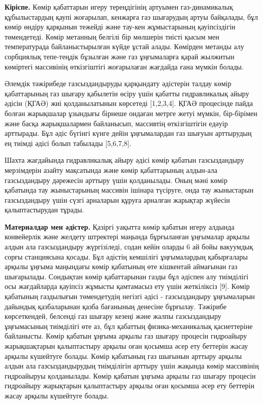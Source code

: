\begin{multicols}{2}
{\bfseries Кіріспе.} Көмір қабаттарын игеру тереңдігінің артуымен
газ-динамикалық құбылыстардың қаупі жоғарылап, кенжарға газ шығарудың
артуы байқалады, бұл көмір өндіру қарқынын тежейді және тау-кен
жұмыстарының қауіпсіздігін төмендетеді. Көмір метанның белгілі бір
мөлшерін тиісті қысым мен температурада байланыстырылған күйде ұстай
алады. Көмірден метанды алу сорбциялық тепе-теңдік бұзылған және газ
ұңғымаларға қарай жылжитын көміртегі массивінің өткізгіштігі жоғарылаған
жағдайда ғана мүмкін болады.

Әлемдік тәжірибеде газсыздандыруды қарқындату әдістерін талдау көмір
қабаттарының газ шығару қабылетін өсіру үшін қабатты гидравликалық айыру
әдісін (ҚГАӘ) жиі қолданылатынын көрсетеді {[}1,2,3,4{]}. ҚГАӘ
процесінде пайда болған жарықшалар ұзындығы бірнеше ондаған метрге жетуі
мүмкін, бір-бірімен және басқа жарықшалармен байланысып, массивтің
өткізгіштігін едәуір арттырады. Бұл әдіс бүгінгі күнге дейін
ұңғымалардан газ шығуын арттырудың ең тиімді әдісі болып табылады
{[}5,6,7,8{]}.

Шахта жағдайында гидравликалық айыру әдісі көмір қабатын газсыздандыру
мерзімдерін азайту мақсатында және көмір қабаттарының алдын-ала
газсыздандыру дәрежесін арттыру үшін қолданылады. Оның мәні көмір
қабатында тау жыныстарының массивін ішінара түсіруге, онда тау
жыныстарын газсыздандыру үшін сүзгі арналарын құруға арналған жарықтар
жүйесін қалыптастырудан тұрады.

{\bfseries Материалдар мен әдістер.} Қазіргі уақытта көмір қабатын игеру
алдында конвейерлік және желдету штректері маңында бұрғыланған ұңғымалар
арқылы алдын ала газсыздандыру жүргізіледі, содан кейін оларды 6 ай бойы
вакуумдық сорғы станциясына қосады. Бұл әдістің кемшілігі ұңғымалардың
қабырғалары арқылы ұңғыма маңындағы көмір қабатының өте кішкентай
аймағынан газ шығарылады. Сондықтан көмір қабаттарынан газды бұл әдіспен
алу тиімділігі осы жағдайларда қауіпсіз жұмысты қамтамасыз ету үшін
жеткіліксіз {[}9{]}. Көмір қабатының газдылығын төмендетудің негізгі
әдісі - газсыздандыру ұңғымаларын дайындық қазбаларынан қазба бағанының
денесіне бұрғылау. Тәжірибе көрсеткендей, белсенді газ шығару кезеңі
және жалпы газсыздандыру ұңғымасының тиімділігі өте аз, бұл қабаттың
физика-механикалық қасиеттеріне байланысты. Көмір қабатын ұңғыма арқылы
газ шығару процесін гидроайыру жарықшақтарын қалыптастыру арқылы оған
қосымша әсер ету беттерін жасау арқылы күшейтуге болады. Көмір қабатының
газ шығынын арттыру арқылы алдын ала газсыздандырудың тиімділігін
арттыру үшін жақында көмір массивінің гидроайыруы қолданылады. Көмір
қабатын ұңғыма арқылы газ шығару процесін гидроайыру жарықтарын
қалыптастыру арқылы оған қосымша әсер ету беттерін жасау арқылы
күшейтуге болады.
\end{multicols}

